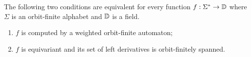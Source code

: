 \begin{theorem}\label{thm:orbit-finite-fliess}
    The following two conditions are equivalent for every function
    $f : \Sigma^* \to \mathbb D$
    where $\Sigma$ is an orbit-finite alphabet and $\mathbb D$ is a field.
    \begin{enumerate}
        \item \label{it:fliess-weighted} $f$ is computed by a weighted orbit-finite automaton;
        \item \label{it:fliess-derivatives} $f$ is equivariant and its set of left derivatives is orbit-finitely spanned.
    \end{enumerate}
\end{theorem}
